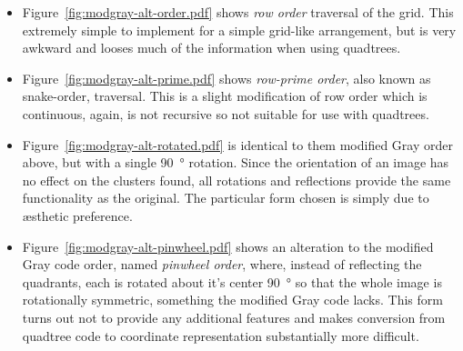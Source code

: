 \begin{itemize}

	\item Figure~\ref{fig:modgray-alt-order.pdf} shows \emph{row order}
		traversal of the grid. This extremely simple to implement for a simple
		grid-like arrangement, but is very awkward and looses much of the
		information when using quadtrees.

	\item Figure~\ref{fig:modgray-alt-prime.pdf} shows \emph{row-prime order},
		also known as snake-order\cite{goodchild1983optimizing}, traversal.
		This is a slight modification of row order which is continuous, again,
		is not recursive so not suitable for use with quadtrees.

	\item Figure~\ref{fig:modgray-alt-rotated.pdf} is identical to them
		modified Gray order above, but with a single \SI{90}{\degree} rotation.
		Since the orientation of an image has no effect on the clusters found,
		all rotations and reflections provide the same functionality as the
		original. The particular form chosen is simply due to {\ae}sthetic
		preference.

	\item Figure~\ref{fig:modgray-alt-pinwheel.pdf} shows an alteration to the
		modified Gray code order, named \emph{pinwheel order}, where, instead of
		reflecting the quadrants, each is rotated about it's center
		\SI{90}{\degree} so that the whole image is rotationally symmetric,
		something the modified Gray code lacks.  This form turns out not to
		provide any additional features and makes conversion from quadtree code
		to coordinate representation substantially more difficult.

\end{itemize}


